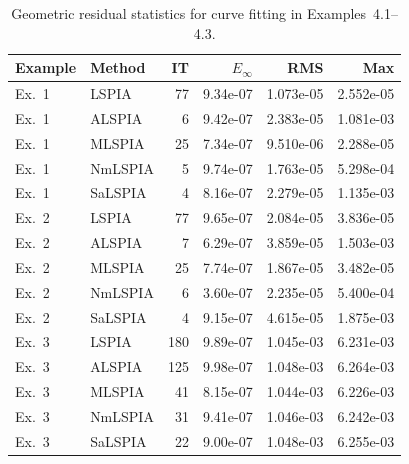 \begin{table}[t]
\centering
\caption{Geometric residual statistics for curve fitting in Examples~4.1--4.3.}
\begin{tabular}{llrrrr}
\hline
Example & Method & IT & $E_\infty$ & RMS & Max \\
\hline
Ex.~1 & LSPIA & 77 & 9.34e-07 & 1.073e-05 & 2.552e-05 \\
Ex.~1 & ALSPIA & 6 & 9.42e-07 & 2.383e-05 & 1.081e-03 \\
Ex.~1 & MLSPIA & 25 & 7.34e-07 & 9.510e-06 & 2.288e-05 \\
Ex.~1 & NmLSPIA & 5 & 9.74e-07 & 1.763e-05 & 5.298e-04 \\
Ex.~1 & SaLSPIA & 4 & 8.16e-07 & 2.279e-05 & 1.135e-03 \\
Ex.~2 & LSPIA & 77 & 9.65e-07 & 2.084e-05 & 3.836e-05 \\
Ex.~2 & ALSPIA & 7 & 6.29e-07 & 3.859e-05 & 1.503e-03 \\
Ex.~2 & MLSPIA & 25 & 7.74e-07 & 1.867e-05 & 3.482e-05 \\
Ex.~2 & NmLSPIA & 6 & 3.60e-07 & 2.235e-05 & 5.400e-04 \\
Ex.~2 & SaLSPIA & 4 & 9.15e-07 & 4.615e-05 & 1.875e-03 \\
Ex.~3 & LSPIA & 180 & 9.89e-07 & 1.045e-03 & 6.231e-03 \\
Ex.~3 & ALSPIA & 125 & 9.98e-07 & 1.048e-03 & 6.264e-03 \\
Ex.~3 & MLSPIA & 41 & 8.15e-07 & 1.044e-03 & 6.226e-03 \\
Ex.~3 & NmLSPIA & 31 & 9.41e-07 & 1.046e-03 & 6.242e-03 \\
Ex.~3 & SaLSPIA & 22 & 9.00e-07 & 1.048e-03 & 6.255e-03 \\
\hline
\end{tabular}
\end{table}

